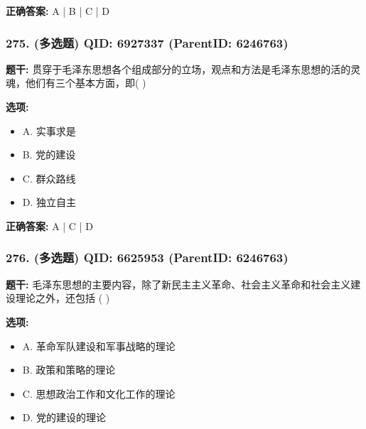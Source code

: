 \documentclass[12pt,UTF8]{ctexart}
\begin{document}
\textbf{正确答案:}
A | B | C | D

\vspace{0.3em}\hrulefill\vspace{0.7em}

\subsubsection*{275. (多选题) \small QID: 6927337 (ParentID: 6246763)}

\textbf{题干:}
贯穿于毛泽东思想各个组成部分的立场，观点和方法是毛泽东思想的活的灵魂，他们有三个基本方面，即(    )



\textbf{选项:}
\begin{itemize}[leftmargin=*]

  \item A. 实事求是

  \item B. 党的建设

  \item C. 群众路线

  \item D. 独立自主

\end{itemize}

\textbf{正确答案:}
A | C | D

\vspace{0.3em}\hrulefill\vspace{0.7em}

\subsubsection*{276. (多选题) \small QID: 6625953 (ParentID: 6246763)}

\textbf{题干:}
毛泽东思想的主要内容，除了新民主主义革命、社会主义革命和社会主义建设理论之外，还包括 ( )



\textbf{选项:}
\begin{itemize}[leftmargin=*]

  \item A. 革命军队建设和军事战略的理论

  \item B. 政策和策略的理论

  \item C. 思想政治工作和文化工作的理论

  \item D. 党的建设的理论

\end{itemize}
\end{document}
